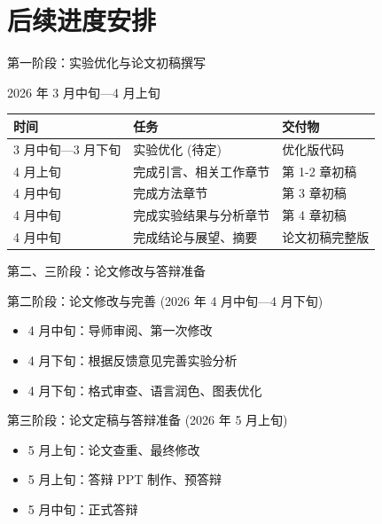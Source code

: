 \documentclass[aspectratio=169, 10pt]{beamer}
\begin{document}
\section{后续进度安排}
\chapterframe

\begin{frame}{第一阶段：实验优化与论文初稿撰写}
\begin{block}{2026 年 3 月中旬—4 月上旬}
\begin{table}
\centering
\small
\begin{tabular}{lll}
\toprule
\textbf{时间} & \textbf{任务} & \textbf{交付物} \\
\midrule
3 月中旬—3 月下旬 & 实验优化 (待定) & 优化版代码 \\
4 月上旬 & 完成引言、相关工作章节 & 第 1-2 章初稿 \\
4 月中旬 & 完成方法章节 & 第 3 章初稿 \\
4 月中旬 & 完成实验结果与分析章节 & 第 4 章初稿 \\
4 月中旬 & 完成结论与展望、摘要 & 论文初稿完整版 \\
\bottomrule
\end{tabular}
\end{table}
\end{block}
\end{frame}

\begin{frame}{第二、三阶段：论文修改与答辩准备}
\begin{block}{第二阶段：论文修改与完善 (2026 年 4 月中旬—4 月下旬)}
\begin{itemize}
    \item 4 月中旬：导师审阅、第一次修改
    \item 4 月下旬：根据反馈意见完善实验分析
    \item 4 月下旬：格式审查、语言润色、图表优化
\end{itemize}
\end{block}

\vspace{0.3cm}
\begin{block}{第三阶段：论文定稿与答辩准备 (2026 年 5 月上旬)}
\begin{itemize}
    \item 5 月上旬：论文查重、最终修改
    \item 5 月上旬：答辩 PPT 制作、预答辩
    \item 5 月中旬：正式答辩
\end{itemize}
\end{block}
\end{frame}
\end{document}
